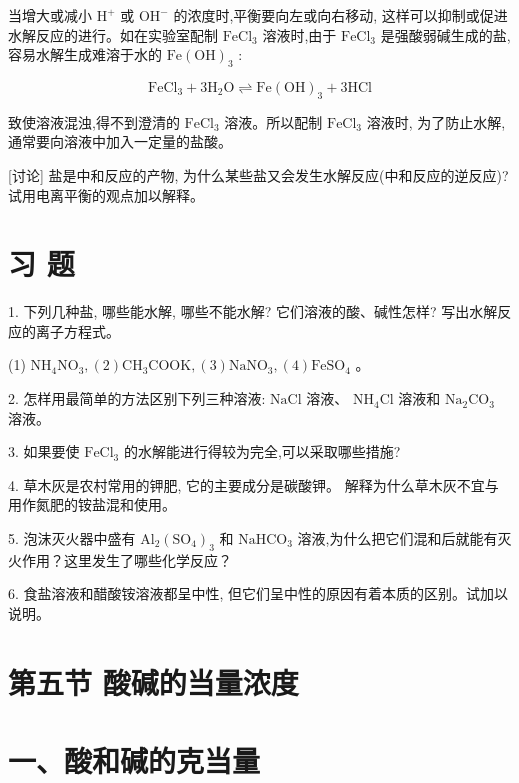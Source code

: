 \documentclass[10pt]{article}
\begin{document}
当增大或减小 \({\mathrm{H}}^{ + }\) 或 \({\mathrm{{OH}}}^{ - }\) 的浓度时,平衡要向左或向右移动, 这样可以抑制或促进水解反应的进行。如在实验室配制 \({\mathrm{{FeCl}}}_{3}\) 溶液时,由于 \({\mathrm{{FeCl}}}_{3}\) 是强酸弱碱生成的盐,容易水解生成难溶于水的 \(\mathrm{{Fe}}{\left( \mathrm{{OH}}\right) }_{3}\) :

\[
{\mathrm{{FeCl}}}_{3} + 3{\mathrm{H}}_{2}\mathrm{O} \rightleftharpoons \mathrm{{Fe}}{\left( \mathrm{{OH}}\right) }_{3} + 3\mathrm{{HCl}}
\]

致使溶液混浊,得不到澄清的 \({\mathrm{{FeCl}}}_{3}\) 溶液。所以配制 \({\mathrm{{FeCl}}}_{3}\) 溶液时, 为了防止水解, 通常要向溶液中加入一定量的盐酸。

[讨论] 盐是中和反应的产物, 为什么某些盐又会发生水解反应(中和反应的逆反应)? 试用电离平衡的观点加以解释。

\section*{习 题}

1. 下列几种盐, 哪些能水解, 哪些不能水解? 它们溶液的酸、碱性怎样? 写出水解反应的离子方程式。

(1) \({\mathrm{{NH}}}_{4}{\mathrm{{NO}}}_{3},\left( 2\right) {\mathrm{{CH}}}_{3}\mathrm{{COOK}},\left( 3\right) {\mathrm{{NaNO}}}_{3},\left( 4\right) {\mathrm{{FeSO}}}_{4}\) 。

2. 怎样用最简单的方法区别下列三种溶液: \(\mathrm{{NaCl}}\) 溶液、 \({\mathrm{{NH}}}_{4}\mathrm{{Cl}}\) 溶液和 \({\mathrm{{Na}}}_{2}{\mathrm{{CO}}}_{3}\) 溶液。

3. 如果要使 \({\mathrm{{FeCl}}}_{3}\) 的水解能进行得较为完全,可以采取哪些措施?

4. 草木灰是农村常用的钾肥, 它的主要成分是碳酸钾。 解释为什么草木灰不宜与用作氮肥的铵盐混和使用。

5. 泡沫灭火器中盛有 \({\mathrm{{Al}}}_{2}{\left( {\mathrm{{SO}}}_{4}\right) }_{3}\) 和 \({\mathrm{{NaHCO}}}_{3}\) 溶液,为什么把它们混和后就能有灭火作用？这里发生了哪些化学反应？

6. 食盐溶液和醋酸铵溶液都呈中性, 但它们呈中性的原因有着本质的区别。试加以说明。

\section*{第五节 酸碱的当量浓度}

\section*{一、酸和碱的克当量}
\end{document}
